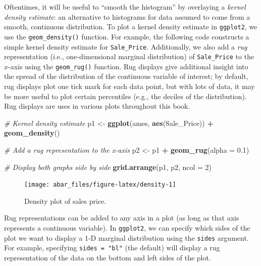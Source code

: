 \documentclass[]{book}
\newenvironment{Shaded}{\begin{snugshade}}{\end{snugshade}}
\newcommand{\CommentTok}[1]{\textcolor[rgb]{0.56,0.35,0.01}{\textit{#1}}}
\newcommand{\DataTypeTok}[1]{\textcolor[rgb]{0.13,0.29,0.53}{#1}}
\newcommand{\DecValTok}[1]{\textcolor[rgb]{0.00,0.00,0.81}{#1}}
\newcommand{\FloatTok}[1]{\textcolor[rgb]{0.00,0.00,0.81}{#1}}
\newcommand{\KeywordTok}[1]{\textcolor[rgb]{0.13,0.29,0.53}{\textbf{#1}}}
\newcommand{\NormalTok}[1]{#1}
\newcommand{\OperatorTok}[1]{\textcolor[rgb]{0.81,0.36,0.00}{\textbf{#1}}}
\newcommand{\StringTok}[1]{\textcolor[rgb]{0.31,0.60,0.02}{#1}}
\theoremstyle{definition}
\theoremstyle{definition}
\theoremstyle{definition}
\theoremstyle{remark}
\let\BeginKnitrBlock\begin \let\EndKnitrBlock\end
\begin{document}
Oftentimes, it will be useful to ``smooth the histogram'' by overlaying
a \emph{kernel density estimate}: an alternative to histograms for data
assumed to come from a smooth, continuous distribution. To plot a kernel
density estimate in \texttt{ggplot2}, we use the
\texttt{geom\_density()} function. For example, the following code
constructs a simple kernel density estimate for \texttt{Sale\_Price}.
Additionally, we also add a \emph{rug} representation (i.e.,
one-dimensional marginal distribution) of \texttt{Sale\_Price} to the
\(x\)-axis using the \texttt{geom\_rug()} function. Rug displays give
additional insight into the spread of the distribution of the continuous
variable of interest; by default, rug displays plot one tick mark for
each data point, but with lots of data, it may be more useful to plot
certain percentiles (e.g., the deciles of the distribution). Rug
displays are uses in various plots throughout this book.

\begin{Shaded}
\begin{Highlighting}[]
\CommentTok{# Kernel density estimate}
\NormalTok{p1 <-}\StringTok{ }\KeywordTok{ggplot}\NormalTok{(ames, }\KeywordTok{aes}\NormalTok{(Sale_Price)) }\OperatorTok{+}
\StringTok{  }\KeywordTok{geom_density}\NormalTok{()}

\CommentTok{# Add a rug representation to the x-axis}
\NormalTok{p2 <-}\StringTok{ }\NormalTok{p1 }\OperatorTok{+}\StringTok{ }\KeywordTok{geom_rug}\NormalTok{(}\DataTypeTok{alpha =} \FloatTok{0.1}\NormalTok{)}

\CommentTok{# Display both graphs side by side}
\KeywordTok{grid.arrange}\NormalTok{(p1, p2, }\DataTypeTok{ncol =} \DecValTok{2}\NormalTok{)}
\end{Highlighting}
\end{Shaded}

\begin{figure}

{\centering \texttt{[image: abar\_files/figure-latex/density-1]} 

}

\caption{Density plot of sales price.}\label{fig:density}
\end{figure}

\BeginKnitrBlock{tip}
Rug representations can be added to any axis in a plot (as long as that
axis represents a continuous variable). In \texttt{ggplot2}, we can
specify which sides of the plot we want to display a 1-D marginal
distribution using the \texttt{sides} argument. For example, specifying
\texttt{sides\ =\ "bl"} (the default) will display a rug representation
of the data on the bottom and left sides of the plot.
\EndKnitrBlock{tip}
\end{document}
